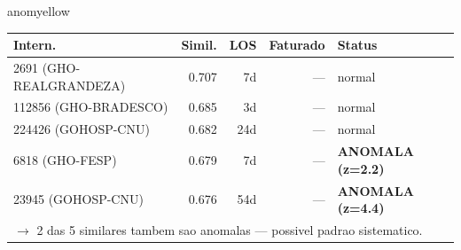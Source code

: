 \documentclass[a4paper,10pt]{article}
\begin{document}
\begin{anomalycard}[Internacao 118725 | GHO-BRADESCO | MODERADO (z=2.83)]{anomyellow}
\begin{tabular}{l r r r l}\toprule\textbf{Intern.} & \textbf{Simil.} & \textbf{LOS} & \textbf{Faturado} & \textbf{Status} \\\midrule
2691 (GHO-REALGRANDEZA) & 0.707 & 7d & --- & \textcolor{jcubeblue}{normal} \\
112856 (GHO-BRADESCO) & 0.685 & 3d & --- & \textcolor{jcubeblue}{normal} \\
224426 (GOHOSP-CNU) & 0.682 & 24d & --- & \textcolor{jcubeblue}{normal} \\
6818 (GHO-FESP) & 0.679 & 7d & --- & \textcolor{anomred}{\textbf{ANOMALA (z=2.2)}} \\
23945 (GOHOSP-CNU) & 0.676 & 54d & --- & \textcolor{anomred}{\textbf{ANOMALA (z=4.4)}} \\
\multicolumn{5}{l}{\textcolor{anomred}{\small $\rightarrow$ 2 das 5 similares tambem sao anomalas --- possivel padrao sistematico.}} \\
\bottomrule\end{tabular}


\end{anomalycard}

\newpage
\end{document}

